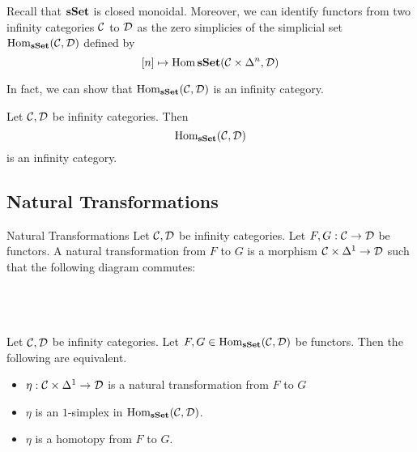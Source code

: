 \documentclass[a4paper]{article}
\begin{document}
Recall that $\bold{sSet}$ is closed monoidal. Moreover, we can identify functors from two infinity categories $\mathcal{C}$ to $\mathcal{D}$ as the zero simplicies of the simplicial set $\operatorname{Hom}_\bold{sSet}(\mathcal{C},\mathcal{D})$ defined by $$[n]\mapsto\operatorname{Hom}\bold{sSet}(\mathcal{C}\times\Delta^n,\mathcal{D})$$

In fact, we can show that $\operatorname{Hom}_\bold{sSet}(\mathcal{C},\mathcal{D})$ is an infinity category. 

\begin{prp}{}{} Let $\mathcal{C},\mathcal{D}$ be infinity categories. Then $$\text{Hom}_\bold{sSet}(\mathcal{C},\mathcal{D})$$ is an infinity category. 
\end{prp}

\subsection{Natural Transformations}
\begin{defn}{Natural Transformations}{} Let $\mathcal{C},\mathcal{D}$ be infinity categories. Let $F,G:\mathcal{C}\to\mathcal{D}$ be functors. A natural transformation from $F$ to $G$ is a morphism $\mathcal{C}\times\Delta^1\to\mathcal{D}$ such that the following diagram commutes: \\~\\
\\~\\
\end{defn}

\begin{lmm}{}{} Let $\mathcal{C},\mathcal{D}$ be infinity categories. Let $F,G\in\operatorname{Hom}_\bold{sSet}(\mathcal{C},\mathcal{D})$ be functors. Then the following are equivalent. 
\begin{itemize}
\item $\eta:\mathcal{C}\times\Delta^1\to\mathcal{D}$ is a natural transformation from $F$ to $G$
\item $\eta$ is an $1$-simplex in $\operatorname{Hom}_\bold{sSet}(\mathcal{C},\mathcal{D})$. 
\item $\eta$ is a homotopy from $F$ to $G$. 
\end{itemize}
\end{lmm}
\end{document}
